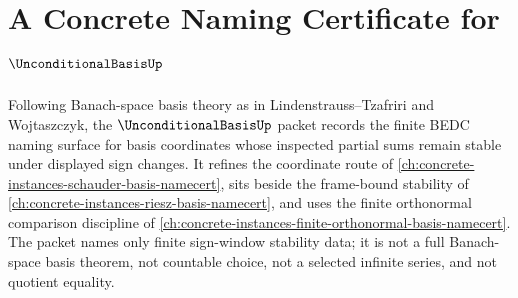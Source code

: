 \chapter{A Concrete Naming Certificate for $\UnconditionalBasisUp$}
\label{ch:concrete-instances-unconditional-basis-namecert}

Following Banach-space basis theory as in Lindenstrauss--Tzafriri and Wojtaszczyk, the $\UnconditionalBasisUp$ packet records the finite BEDC naming surface for basis coordinates whose inspected partial sums remain stable under displayed sign changes. It refines the coordinate route of \autoref{ch:concrete-instances-schauder-basis-namecert}, sits beside the frame-bound stability of \autoref{ch:concrete-instances-riesz-basis-namecert}, and uses the finite orthonormal comparison discipline of \autoref{ch:concrete-instances-finite-orthonormal-basis-namecert}. The packet names only finite sign-window stability data; it is not a full Banach-space basis theorem, not countable choice, not a selected infinite series, and not quotient equality.

